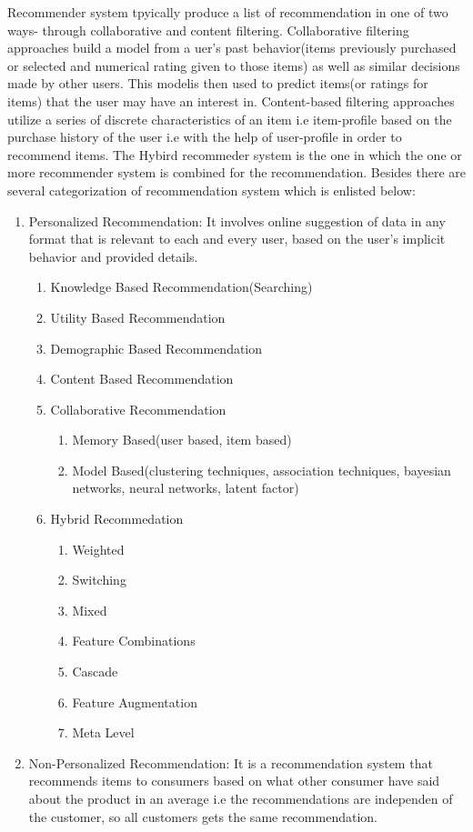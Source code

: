 Recommender system tpyically produce a list of recommendation in one of two ways- through collaborative and content filtering. Collaborative filtering approaches build a model from a uer's past behavior(items previously purchased or selected and numerical rating given to those items) as well as similar decisions made by other users. This modelis then used to predict items(or ratings for items) that the user may have an interest in. Content-based filtering approaches utilize a series of discrete characteristics of an item i.e item-profile based on the purchase history of the user i.e with the help of user-profile in order to recommend items. The Hybird recommeder system is the one in which the one or more recommender system is combined for the recommendation. Besides there are several categorization of recommendation system which is enlisted below:
\begin{enumerate}
	\item Personalized Recommendation: It involves online suggestion of data in any format that is relevant to each and every user, based on the user's implicit behavior and provided details.
	\begin{enumerate}
	\item Knowledge Based Recommendation(Searching)
	\item Utility Based Recommendation
	\item Demographic Based Recommendation
	\item Content Based Recommendation
	\item Collaborative Recommendation
		\begin{enumerate}
			\item Memory Based(user based, item based)
			\item Model Based(clustering techniques, association techniques, bayesian networks, neural networks, latent factor)
		\end{enumerate}
	\item Hybrid Recommedation
		\begin{enumerate}
			\item Weighted
			\item Switching
			\item Mixed
			\item Feature Combinations
			\item Cascade
			\item Feature Augmentation
			\item Meta Level
		\end{enumerate}
	\end{enumerate}
	\item Non-Personalized Recommendation: It is a recommendation system that recommends items to consumers based on what other consumer have said about the product in an average i.e the recommendations are independen of the customer, so all customers gets the same recommendation.
\end{enumerate}
